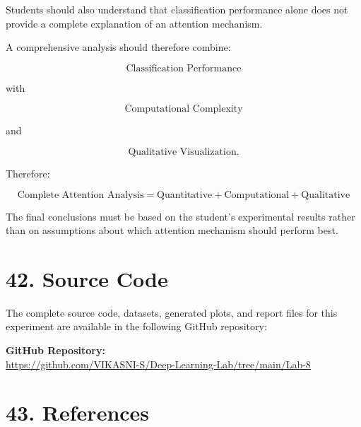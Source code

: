 \documentclass[10pt]{article}
\begin{document}
Students should also understand that classification performance alone does
not provide a complete explanation of an attention mechanism.

A comprehensive analysis should therefore combine:

\[
\boxed{
\text{Classification Performance}
}
\]

with

\[
\boxed{
\text{Computational Complexity}
}
\]

and

\[
\boxed{
\text{Qualitative Visualization}.
}
\]

Therefore:

\[
\boxed{
\text{Complete Attention Analysis}
=
\text{Quantitative}
+
\text{Computational}
+
\text{Qualitative}
}
\]

The final conclusions must be based on the student's experimental results
rather than on assumptions about which attention mechanism should perform
best.

\section*{42. Source Code}


The complete source code, datasets, generated plots, and report files for this experiment are available in the following GitHub repository:



\noindent\textbf{GitHub Repository:} \\
\url{https://github.com/VIKASNI-S/Deep-Learning-Lab/tree/main/Lab-8}\\


\section*{43. References}
\end{document}
